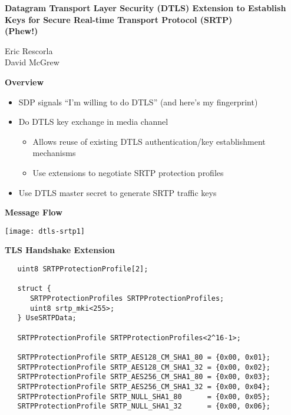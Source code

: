\documentclass[helvetica,fancybox,landscape]{seminar}
\newcommand{\heading}[1]{%
  \begin{center} 
    \large\bf 
    #1 
  \end{center} 
  \vspace{.4 in}}
\begin{document}
\begin{slide}
\begin{center} 
\LARGE{{\bf Datagram Transport Layer Security
    (DTLS) Extension to Establish Keys for Secure Real-time Transport Protocol
    (SRTP)\\ (Phew!)}}
\end{center} 
\begin{center}
\vspace{.3 in} 
\large{Eric Rescorla}\\
\large{David McGrew}\\
\end{center}
\end{slide}


\begin{slide}
\heading{Overview}

\begin{itemize}
\item SDP signals ``I'm willing to do DTLS'' (and here's my fingerprint)
\item Do DTLS key exchange in media channel
\begin{itemize}
\item Allows reuse of existing DTLS authentication/key establishment mechanisms
\item Use extensions to negotiate SRTP protection profiles
\end{itemize}
\item Use DTLS master secret to generate SRTP traffic keys
\end{itemize}

\end{slide}

\begin{slide}
\heading{Message Flow}

\vspace{-.4 in}
\texttt{[image: dtls-srtp1]}

\end{slide}


\begin{slide}
\heading{TLS Handshake Extension}

{\tiny
\begin{verbatim}
   uint8 SRTPProtectionProfile[2];

   struct {
      SRTPProtectionProfiles SRTPProtectionProfiles;
      uint8 srtp_mki<255>;
   } UseSRTPData;

   SRTPProtectionProfile SRTPProtectionProfiles<2^16-1>;

   SRTPProtectionProfile SRTP_AES128_CM_SHA1_80 = {0x00, 0x01};
   SRTPProtectionProfile SRTP_AES128_CM_SHA1_32 = {0x00, 0x02};
   SRTPProtectionProfile SRTP_AES256_CM_SHA1_80 = {0x00, 0x03};
   SRTPProtectionProfile SRTP_AES256_CM_SHA1_32 = {0x00, 0x04};
   SRTPProtectionProfile SRTP_NULL_SHA1_80      = {0x00, 0x05};
   SRTPProtectionProfile SRTP_NULL_SHA1_32      = {0x00, 0x06};
\end{verbatim}
}
\end{slide}
\end{document}
